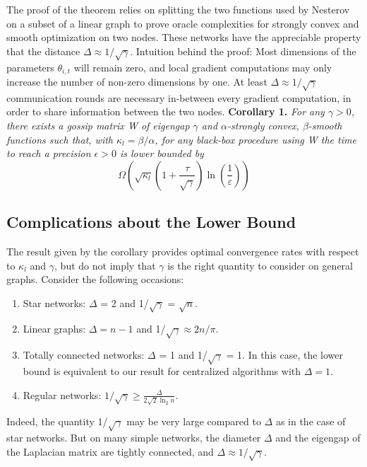 \documentclass[12pt]{article}
\begin{document}
\newline
The proof of the theorem relies on splitting the two functions used by Nesterov on a subset of a linear graph to prove oracle complexities for strongly convex and smooth optimization on two nodes. These networks have the appreciable property that the distance $\Delta\approx 1/\sqrt{\gamma}$. 
\newline
\newline
Intuition behind the proof: 
\newline
Most dimensions of the parameters $\theta_{i,t}$ will remain zero, and local gradient computations may only increase the number of non-zero dimensions by one. 
\newline
At least $\Delta\approx 1/\sqrt{\gamma}$ communication rounds are necessary in-between every gradient computation, in order to share information between the two nodes. 
\newline
\newline
\textbf{Corollary 1. }\textit{For any $\gamma > 0$, there exists a gossip matrix W of eigengap $\gamma$ and $\alpha$-strongly convex, $\beta$-smooth functions such that, with $\kappa_l = \beta/\alpha$, for any black-box procedure using W the time to reach a precision $\epsilon > 0$ is lower bounded by}
$$\Omega\left(\sqrt{\kappa_{l}}\left(1+\frac{\tau}{\sqrt{\gamma}}\right) \ln \left(\frac{1}{\varepsilon}\right)\right)$$
\subsection{Complications about the Lower Bound}
The result given by the corollary provides optimal convergence rates with respect to $\kappa_l$ and $\gamma$, but do not imply that $\gamma$ is the right quantity to consider on general graphs. Consider the following occasions:
\begin{enumerate}
    \item Star networks: $\Delta$ = 2 and 1/$\sqrt{\gamma}$ = $\sqrt{n}$. 
    \item Linear graphs: $\Delta = n - 1$ and 1/$\sqrt{\gamma}\approx 2n/\pi$.
    \item Totally connected networks: $\Delta$ = 1 and 1/$\sqrt{\gamma}$ = 1. In this case, the lower bound is equivalent to our result for centralized algorithms with $\Delta = 1$. 
    \item Regular networks: $1 / \sqrt{\gamma} \geq \frac{\Delta}{2 \sqrt{2} \ln _{2} n}$. 
\end{enumerate}
Indeed, the quantity 1/$\sqrt{\gamma}$ may be very large compared to $\Delta$ as in the case of star networks. But on many simple networks, the diameter $\Delta$ and the eigengap of the Laplacian matrix are tightly connected, and $\Delta\approx 1/\sqrt{\gamma}$. 
\end{document}
